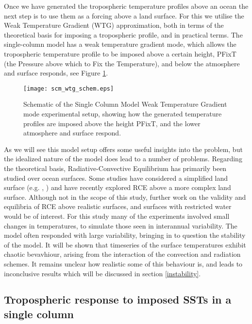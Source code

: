 Once we have generated the tropospheric temperature profiles above an ocean the 
next step is to use them as a forcing above a land surface. For this we utilise 
the Weak Temperature Gradient (WTG) approximation, both in terms of the 
theoretical basis for imposing a tropospheric profile, and in practical terms.  
The single-column model has a weak temperature gradient mode, which allows the 
tropospheric temperature profile to be imposed above a certain height, PFixT 
(the Pressure above which to Fix the Temperature), and below the atmosphere and 
surface responds, see Figure \ref{fig:scmschem}.

\begin{figure}[ht]
\texttt{[image: scm\_wtg\_schem.eps]}
\caption{Schematic of the Single Column Model Weak Temperature Gradient mode 
experimental setup, showing how the generated temperature profiles are imposed 
above the height PFixT, and the lower atmosphere and surface respond.}
\label{fig:scmschem}
\end{figure}

As we will see this model setup offers some useful insights into the problem, 
but the idealized nature of the model does lead to a number of problems.  
Regarding the theoretical basis, Radiative-Convective Equilibrium has primarily 
been studied over ocean surfaces. Some studies have considered a simplified land 
surface (e.g. \citet{Renno1997}, \citet{Prigent2007}) and \citet{Rochetin2014} 
have recently explored RCE above a more complex land surface.  Although not in 
the scope of this study, further work on the validity and equilibria of RCE 
above realistic surfaces, and surfaces with restricted water would be of 
interest.  For this study many of the experiments involved small changes in 
temperatures, to simulate those seen in interannual variability.  The model 
often responded with large variability, bringing in to question the stability of 
the model. It will be shown that timeseries of the surface temperatures exhibit 
chaotic bevavhiour, arising from the interaction of the convection and radiation 
schemes. It remains unclear how realistic some of this behaviour is, and leads 
to inconclusive results which will be discussed in section \ref{instability}.

\subsection{Tropospheric response to imposed SSTs in a single column}
\label{trop_response_ocean}


